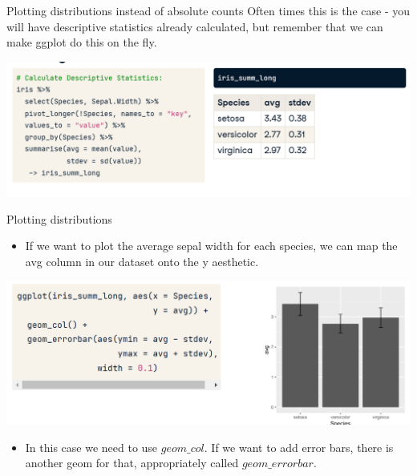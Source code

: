 \documentclass[
  ignorenonframetext,
]{beamer}
\providecommand{\tightlist}{%
  \setlength{\itemsep}{0pt}\setlength{\parskip}{0pt}}
\begin{document}
\begin{frame}{Plotting distributions instead of absolute counts}
\label{plotting-distributions-instead-of-absolute-counts}
Often times this is the case - you will have descriptive statistics
already calculated, but remember that we can make ggplot do this on the
fly.

\includegraphics{../images/im208.png}
\end{frame}

\begin{frame}{Plotting distributions}
\label{plotting-distributions}
\begin{itemize}
\tightlist
\item
  If we want to plot the average sepal width for each species, we can
  map the avg column in our dataset onto the y aesthetic.
\end{itemize}

\includegraphics{../images/im209.png}

\begin{itemize}
\tightlist
\item
  In this case we need to use \(geom\_col\). If we want to add error
  bars, there is another geom for that, appropriately called
  \(geom\_errorbar\).
\end{itemize}
\end{frame}
\end{document}
